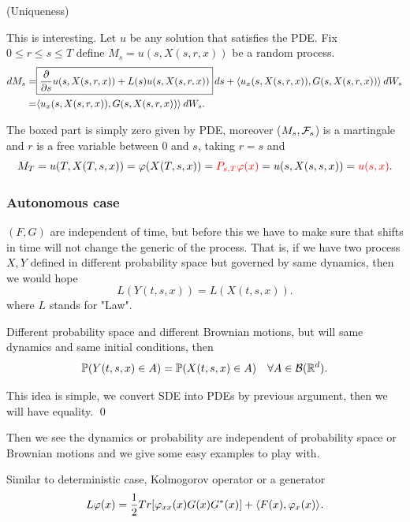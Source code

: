 (Uniqueness) 

This is interesting. Let $u$ be any solution that satisfies the PDE. Fix $0\leq r \leq s \leq T$ define $M_s = u(s,X(s,r,x))$ be a random process.
\begin{align*}
    \mathop{}\!d M_s =& \boxed{\frac{\partial }{\partial s}  u(s,X(s,r,x)) + L(s) u(s,X(s,r,x)) }\mathop{}\!d s + \langle{u_x(s,X(s,r,x)), G(s,X(s,r,x))} \rangle_{} \mathop{}\!d W_s \\
    =& \langle{u_x(s,X(s,r,x)), G(s,X(s,r,x))} \rangle_{} \mathop{}\!d W_s.
\end{align*}

The boxed part is simply zero given by PDE, moreover ($M_s, \mathcal{F}_s$) is a martingale and $r$ is a free variable between $0$ and $s$, taking $r=s$ and
\begin{equation*}
    M_T = u(T,X(T,s,x)) = \varphi(X(T,s,x))= \textcolor{red}{P_{s,T}\varphi(x)}= u(s,X(s,s,x)) = \textcolor{red}{u(s,x)}.
\end{equation*}

\subsubsection{Autonomous case}
$(F,G)$ are independent of time, but before this we have to make sure that shifts in time will not change the generic of the process. That is, if we have two process $X,Y$ defined in different probability space but governed by same dynamics, then we would hope
\begin{equation*}
    L(Y(t,s,x)) = L(X(t,s,x)).
\end{equation*} 
where $L$ stands for "Law".

\begin{thm}
Different probability space and different Brownian motions, but will same dynamics and same initial conditions, then
\begin{equation*}
    \mathbb{P}(Y(t,s,x)\in A) = \mathbb{P}(X(t,s,x)\in A) \quad \forall A\in \mathcal{B}(\mathbb{R}^d).
\end{equation*}
\end{thm}
\pf This idea is simple, we convert SDE into PDEs by previous argument, then we will have equality. 
\qed

Then we see the dynamics or probability are independent of probability space or Brownian motions and we give some easy examples to play with.

Similar to deterministic case, 
Kolmogorov operator or a generator
\begin{equation*}
    L\varphi(x) = \frac{1}{2} Tr[\varphi_{xx}(x) G(x) G^*(x)] + \langle{F(x), \varphi_x(x)} \rangle_{}.
\end{equation*}

